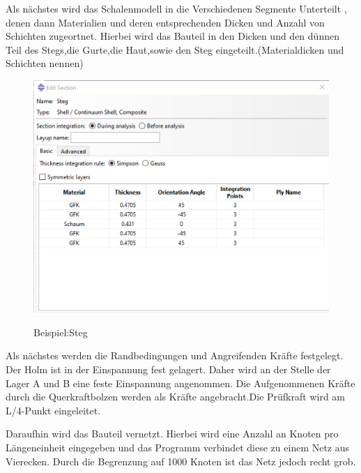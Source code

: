 Als nächstes wird das Schalenmodell in die Verschiedenen Segmente Unterteilt , denen dann Materialien und deren entsprechenden Dicken und Anzahl von Schichten zugeortnet. Hierbei wird das Bauteil in den Dicken und den dünnen Teil des Stegs,die Gurte,die Haut,sowie den Steg eingeteilt.(Materialdicken und Schichten nennen)
\begin{figure}[h]
 \centering
 \includegraphics[scale=0.4]{Bilder/Steg_Material}
 \label{Steg_Material}
 \caption{Beispiel:Steg}
\end{figure}
Als nächstes werden die Randbedingungen und Angreifenden Kräfte festgelegt. Der Holm ist in der Einspannung fest gelagert. Daher wird an der Stelle der Lager A und B eine feste Einspannung angenommen. Die Aufgenommenen Kräfte durch die Querkraftbolzen werden als Kräfte angebracht.Die Prüfkraft wird am L/4-Punkt eingeleitet.

Daraufhin wird das Bauteil vernetzt. Hierbei wird eine Anzahl an Knoten pro Längeneinheit eingegeben und das Programm verbindet diese zu einem Netz aus Vierecken. Durch die Begrenzung auf 1000 Knoten ist das Netz jedoch recht grob. \\
\newpage
